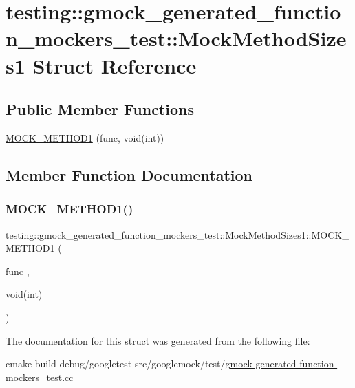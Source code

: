 \hypertarget{structtesting_1_1gmock__generated__function__mockers__test_1_1MockMethodSizes1}{}\section{testing\+::gmock\+\_\+generated\+\_\+function\+\_\+mockers\+\_\+test\+::Mock\+Method\+Sizes1 Struct Reference}
\label{structtesting_1_1gmock__generated__function__mockers__test_1_1MockMethodSizes1}
\subsection*{Public Member Functions}
\begin{DoxyCompactItemize}
\item 
\mbox{\hyperlink{structtesting_1_1gmock__generated__function__mockers__test_1_1MockMethodSizes1_af4d80458626303520a848ad15e0e8121}{M\+O\+C\+K\+\_\+\+M\+E\+T\+H\+O\+D1}} (func, void(int))
\end{DoxyCompactItemize}


\subsection{Member Function Documentation}
\mbox{\label{structtesting_1_1gmock__generated__function__mockers__test_1_1MockMethodSizes1_af4d80458626303520a848ad15e0e8121}} 
\subsubsection{\texorpdfstring{MOCK\_METHOD1()}{MOCK\_METHOD1()}}
{\footnotesize\ttfamily testing\+::gmock\+\_\+generated\+\_\+function\+\_\+mockers\+\_\+test\+::\+Mock\+Method\+Sizes1\+::\+M\+O\+C\+K\+\_\+\+M\+E\+T\+H\+O\+D1 (\begin{DoxyParamCaption}\item[{func}]{,  }\item[{void(int)}]{ }\end{DoxyParamCaption})}



The documentation for this struct was generated from the following file\+:\begin{DoxyCompactItemize}
\item 
cmake-\/build-\/debug/googletest-\/src/googlemock/test/\mbox{\hyperlink{gmock-generated-function-mockers__test_8cc}{gmock-\/generated-\/function-\/mockers\+\_\+test.\+cc}}\end{DoxyCompactItemize}
